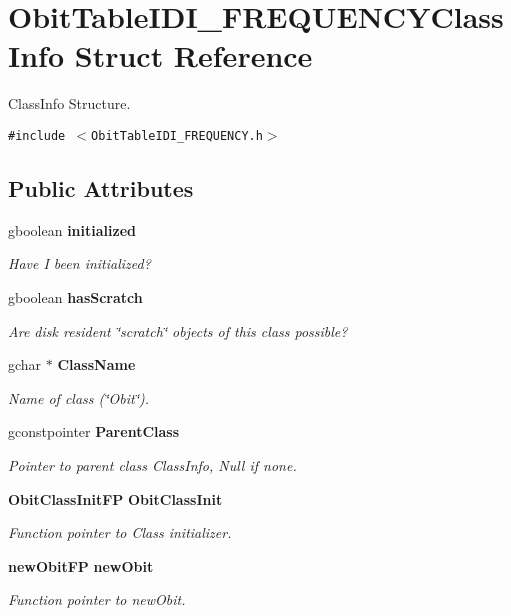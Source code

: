 \section{Obit\-Table\-IDI\_\-FREQUENCYClass\-Info Struct Reference}
\label{structObitTableIDI__FREQUENCYClassInfo}
Class\-Info Structure.  


{\tt \#include $<$Obit\-Table\-IDI\_\-FREQUENCY.h$>$}

\subsection*{Public Attributes}
\begin{CompactItemize}
\item 
gboolean {\bf initialized}
\begin{CompactList}\small\item\em Have I been initialized? \item\end{CompactList}\item 
gboolean {\bf has\-Scratch}
\begin{CompactList}\small\item\em Are disk resident \char`\"{}scratch\char`\"{} objects of this class possible? \item\end{CompactList}\item 
gchar $\ast$ {\bf Class\-Name}
\begin{CompactList}\small\item\em Name of class (\char`\"{}Obit\char`\"{}). \item\end{CompactList}\item 
gconstpointer {\bf Parent\-Class}
\begin{CompactList}\small\item\em Pointer to parent class Class\-Info, Null if none. \item\end{CompactList}\item 
{\bf Obit\-Class\-Init\-FP} {\bf Obit\-Class\-Init}
\begin{CompactList}\small\item\em Function pointer to Class initializer. \item\end{CompactList}\item 
{\bf new\-Obit\-FP} {\bf new\-Obit}
\begin{CompactList}\small\item\em Function pointer to new\-Obit. \item\end{CompactList}\item 

\end{CompactItemize}
